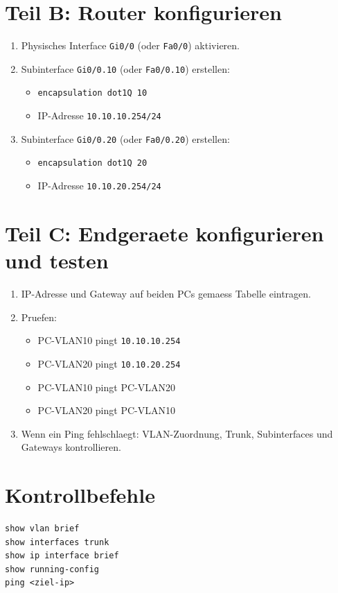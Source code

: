 \documentclass[11pt, oneside, numbers=noenddot]{scrbook}
\begin{document}
\section{Teil B: Router konfigurieren}
\begin{enumerate}
\item Physisches Interface \texttt{Gi0/0} (oder \texttt{Fa0/0}) aktivieren.
\item Subinterface \texttt{Gi0/0.10} (oder \texttt{Fa0/0.10}) erstellen:
\begin{itemize}
\item \texttt{encapsulation dot1Q 10}
\item IP-Adresse \texttt{10.10.10.254/24}
\end{itemize}
\item Subinterface \texttt{Gi0/0.20} (oder \texttt{Fa0/0.20}) erstellen:
\begin{itemize}
\item \texttt{encapsulation dot1Q 20}
\item IP-Adresse \texttt{10.10.20.254/24}
\end{itemize}
\end{enumerate}

\section{Teil C: Endgeraete konfigurieren und testen}
\begin{enumerate}
\item IP-Adresse und Gateway auf beiden PCs gemaess Tabelle eintragen.
\item Pruefen:
\begin{itemize}
\item PC-VLAN10 pingt \texttt{10.10.10.254}
\item PC-VLAN20 pingt \texttt{10.10.20.254}
\item PC-VLAN10 pingt PC-VLAN20
\item PC-VLAN20 pingt PC-VLAN10
\end{itemize}
\item Wenn ein Ping fehlschlaegt: VLAN-Zuordnung, Trunk, Subinterfaces und Gateways kontrollieren.
\end{enumerate}

\section{Kontrollbefehle}
\begin{verbatim}
show vlan brief
show interfaces trunk
show ip interface brief
show running-config
ping <ziel-ip>
\end{verbatim}
\end{document}
